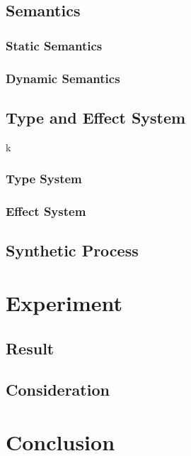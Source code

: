 \documentclass[12pt, a4paper, titlepage]{report}
\begin{document}
  \section{Semantics}
    \subsection{Static Semantics} %
    \subsection{Dynamic Semantics} %
  \section{Type and Effect System}k
    \subsection{Type System}
    \subsection{Effect System}
  \section{Synthetic Process}

\chapter{Experiment}\label{section:experiment}
\section{Result}
\section{Consideration}

\chapter{Conclusion}\label{section:conclusion}



\end{document}

